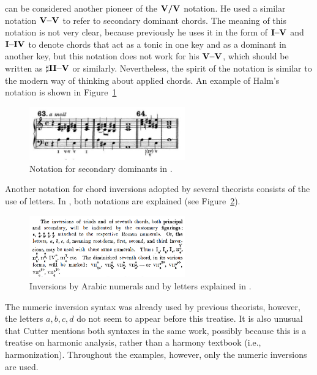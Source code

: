 \textcite{halm1900harmonielehre} can be considered another pioneer of the $\textbf{V/V}\relax\relax$ notation.
He used a similar notation $\textbf{V--V}\relax\relax$ to refer to secondary dominant chords.
The meaning of this notation is not very clear, because previously he uses it in the form of $\textbf{I--V}\relax\relax$ and $\textbf{I--IV}\relax\relax$ to denote chords that act as a tonic in one key and as a dominant in another key, but this notation does not work for his $\textbf{V--V}\relax\relax$, which should be written as $\sharp{}\textbf{II--V}\relax\relax$ or similarly.
Nevertheless, the spirit of the notation is similar to the modern way of thinking about applied chords.
An example of Halm's notation is shown in Figure~\ref{fig:halm1900harmonielehreXVII}

\begin{figure}[h!]
    \centering
    \includegraphics[width=0.6\textwidth]{figures/chapter/2/primary_sources/halm1900harmonielehreXVII.png}
    \caption{Notation for secondary dominants in \textcite{halm1900harmonielehre}.}
    \label{fig:halm1900harmonielehreXVII}
\end{figure}


Another notation for chord inversions adopted by several theorists consists of the use of letters.
In \textcite{cutter1902harmonic}, both notations are explained (see Figure~\ref{fig:cutter1902harmonic004}).

\begin{figure}[h!]
    \centering
    \includegraphics[width=0.6\textwidth]{figures/chapter/2/primary_sources/cutter1902harmonic004.png}
    \caption{Inversions by Arabic numerals and by letters explained in \textcite{halm1900harmonielehre}.}
    \label{fig:cutter1902harmonic004}
\end{figure}

The numeric inversion syntax was already used by previous theorists, however, the letters ${a, b, c , d}$ do not seem to appear before this treatise.
It is also unusual that Cutter mentions both syntaxes in the same work, possibly because this is a treatise on harmonic analysis, rather than a harmony textbook (i.e., harmonization).
Throughout the examples, however, only the numeric inversions are used.


